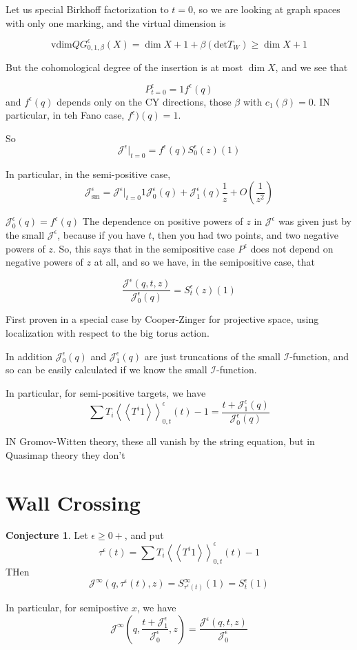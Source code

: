 \documentclass{amsart}
\theoremstyle{definition}
\newtheorem{conjecture}[dummy]{Conjecture}
\newcommand{\I}{\mathcal{I}}
\newcommand{\J}{\mathcal{J}}
\newcommand{\one}{1}
\begin{document}
Let us special Birkhoff factorization to $t=0$, so we are looking at graph spaces with only one marking, and the virtual dimension is

$$\text{vdim} QG^\epsilon_{0,1,\beta}(X)=\dim X+1+\beta(\text{det} T_W)\geq \dim X+1$$

But the cohomological degree of the insertion is at most $\dim X$, and we see that

$$P^\epsilon_{t=0}=\one f^\epsilon(q)$$
and $f^\epsilon(q)$ depends only on the CY directions, those $\beta$ with $c_1(\beta)=0$.  IN particular, in teh Fano case, $f^\epsilon)(q)=1$.

So
$$\J^\epsilon|_{t=0}=f^\epsilon(q)S^\epsilon_0(z)(\one) $$

In particular, in the semi-positive case, $$\J^\epsilon_{\text{sm}}=\J^\epsilon|_{t=0}\one\J_0^\epsilon(q)+\J^\epsilon_1(q)\frac{1}{z}+O(\frac{1}{z^2})$$ 

$\J_0^\epsilon(q)=f^\epsilon(q)$
The dependence on positive powers of $z$ in $\J^\epsilon$ was given just by the small $\J^\epsilon$, because if you have $t$, then you had two points, and two negative powers of $z$.  So, this says that in the semipositive case $P^\epsilon$ does not depend on negative powers of $z$ at all, and so we have, in the semipositive case, that

$$\frac{\J^\epsilon(q,t,z)}{\J_0^\epsilon(q)}=S_t^\epsilon(z)(\one)$$

First proven in a special case by Cooper-Zinger for projective space, using localization with respect to the big torus action.

In addition $\J_0^\epsilon(q)$ and $\J_1^\epsilon(q)$ are just truncations of the small $\I$-function, and so can be easily calculated if we know the small $\I$-function.


In particular, for semi-positive targets, we have $$\sum T_i\left\langle\left\langle T^i\one\right\rangle\right\rangle^\epsilon_{0,t}(t)-\one=\frac{t+\J_1^\epsilon(q)}{\J_0^\epsilon(q)}$$

IN Gromov-Witten theory, these all vanish by the string equation, but in Quasimap theory they don't
\section{Wall Crossing}


\begin{conjecture}
Let $\epsilon\geq 0+$, and put
$$\tau^\epsilon(t)=\sum T_i\left\langle\left\langle T^i\one\right\rangle\right\rangle^\epsilon_{0,t}(t)-\one$$
THen
$$\J^\infty(q,\tau^\epsilon(t),z)=S^\infty_{\tau^\epsilon(t)}(\one)=S_t^\epsilon(\one)$$

In particular, for semipostive $x$, we have
$$\J^\infty(q,\frac{t+\J_1^\epsilon}{\J_0^\epsilon},z)=\frac{\J^\epsilon(q,t,z)}{\J_0^\epsilon}$$
\end{conjecture}
\end{document}
